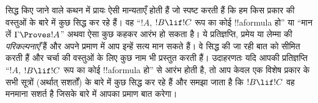 \documentclass[../../../include/open-logic-section]{subfiles}
\begin{document}
सिद्ध किए जाने वाले कथन में प्रायः ऐसी मान्यताएँ होती हैं जो स्पष्ट करती
हैं कि हम किस प्रकार की वस्तुओं के बारे में कुछ सिद्ध कर रहे हैं। वह
``$!A$, $!B\lif !C$ रूप का कोई !!a{formula} हो'' या ``मान लें
$\Gamma\Proves !A$'' अथवा ऐसा कुछ कहकर आरंभ हो सकता है। ये प्रतिज्ञप्ति,
प्रमेय या लेम्मा की \emph{परिकल्पनाएँ} हैं और अपने प्रमाण में आप इन्हें सत्य
मान सकते हैं। वे सिद्ध की जा रही बात को सीमित करती हैं और चर्चा की वस्तुओं
के लिए कुछ नाम भी प्रस्तुत करती हैं। उदाहरणतः यदि आपकी प्रतिज्ञप्ति
``$!A$, $!B\lif !C$ रूप का कोई !!a{formula} हो'' से आरंभ होती है, तो आप
केवल एक विशेष प्रकार के सभी सूत्रों (अर्थात् सशर्तों) के बारे में कुछ सिद्ध
कर रहे हैं और समझा जाता है कि $!B\lif !C$ वह मनमाना सशर्त है जिसके बारे में
आपका प्रमाण बात करेगा।
\end{document}
